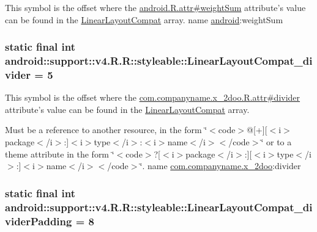 This symbol is the offset where the \hyperlink{}{android.R.attr\#weightSum} attribute's value can be found in the \hyperlink{classandroid_1_1support_1_1v4_1_1_r_1_1styleable_d67ed8d09a6471da7a8c3ba1552dad7e}{LinearLayoutCompat} array.  name \hyperlink{namespaceandroid}{android}:weightSum \hypertarget{classandroid_1_1support_1_1v4_1_1_r_1_1styleable_678fcd55c5a19e3fde49a5ec33331fd9}{
\subsubsection[{LinearLayoutCompat\_\-divider}]{\setlength{\rightskip}{0pt plus 5cm}static final int android::support::v4.R.R::styleable::LinearLayoutCompat\_\-divider = 5}}
\label{classandroid_1_1support_1_1v4_1_1_r_1_1styleable_678fcd55c5a19e3fde49a5ec33331fd9}


This symbol is the offset where the \hyperlink{classcom_1_1companyname_1_1x__2doo_1_1_r_1_1attr_3c36e19f15695ee78d2af0600da21466}{com.companyname.x\_\-2doo.R.attr\#divider} attribute's value can be found in the \hyperlink{classandroid_1_1support_1_1v4_1_1_r_1_1styleable_d67ed8d09a6471da7a8c3ba1552dad7e}{LinearLayoutCompat} array.

Must be a reference to another resource, in the form \char`\"{}$<$code$>$@\mbox{[}+\mbox{]}\mbox{[}$<$i$>$package$<$/i$>$:\mbox{]}$<$i$>$type$<$/i$>$:$<$i$>$name$<$/i$>$$<$/code$>$\char`\"{} or to a theme attribute in the form \char`\"{}$<$code$>$?\mbox{[}$<$i$>$package$<$/i$>$:\mbox{]}\mbox{[}$<$i$>$type$<$/i$>$:\mbox{]}$<$i$>$name$<$/i$>$$<$/code$>$\char`\"{}.  name \hyperlink{namespacecom_1_1companyname_1_1x__2doo}{com.companyname.x\_\-2doo}:divider \hypertarget{classandroid_1_1support_1_1v4_1_1_r_1_1styleable_00ee5a3b1918e743d8959a4de0289516}{
\subsubsection[{LinearLayoutCompat\_\-dividerPadding}]{\setlength{\rightskip}{0pt plus 5cm}static final int android::support::v4.R.R::styleable::LinearLayoutCompat\_\-dividerPadding = 8}}
\label{classandroid_1_1support_1_1v4_1_1_r_1_1styleable_00ee5a3b1918e743d8959a4de0289516}


